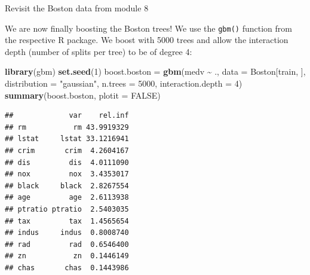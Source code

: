 \documentclass[
  10pt,
  ignorenonframetext,
]{beamer}
\newenvironment{Shaded}{\begin{snugshade}}{\end{snugshade}}
\newcommand{\AttributeTok}[1]{\textcolor[rgb]{0.13,0.29,0.53}{#1}}
\newcommand{\ConstantTok}[1]{\textcolor[rgb]{0.56,0.35,0.01}{#1}}
\newcommand{\DecValTok}[1]{\textcolor[rgb]{0.00,0.00,0.81}{#1}}
\newcommand{\FunctionTok}[1]{\textcolor[rgb]{0.13,0.29,0.53}{\textbf{#1}}}
\newcommand{\NormalTok}[1]{#1}
\newcommand{\OtherTok}[1]{\textcolor[rgb]{0.56,0.35,0.01}{#1}}
\newcommand{\SpecialCharTok}[1]{\textcolor[rgb]{0.81,0.36,0.00}{\textbf{#1}}}
\newcommand{\StringTok}[1]{\textcolor[rgb]{0.31,0.60,0.02}{#1}}
\begin{document}
\begin{frame}[fragile]
\begin{block}{Revisit the Boston data from module 8}
\protect\hypertarget{revisit-the-boston-data-from-module-8}{}
\(~\)

We are now finally boosting the Boston trees! We use the \texttt{gbm()}
function from the respective R package. We boost with 5000 trees and
allow the interaction depth (number of splits per tree) to be of degree
4:

\vspace{2mm}

\scriptsize

\begin{Shaded}
\begin{Highlighting}[]
\FunctionTok{library}\NormalTok{(gbm)}
\FunctionTok{set.seed}\NormalTok{(}\DecValTok{1}\NormalTok{)}
\NormalTok{boost.boston }\OtherTok{=} \FunctionTok{gbm}\NormalTok{(medv }\SpecialCharTok{\textasciitilde{}}\NormalTok{ ., }\AttributeTok{data =}\NormalTok{ Boston[train, ], }\AttributeTok{distribution =} \StringTok{"gaussian"}\NormalTok{,}
    \AttributeTok{n.trees =} \DecValTok{5000}\NormalTok{, }\AttributeTok{interaction.depth =} \DecValTok{4}\NormalTok{)}
\FunctionTok{summary}\NormalTok{(boost.boston, }\AttributeTok{plotit =} \ConstantTok{FALSE}\NormalTok{)}
\end{Highlighting}
\end{Shaded}

\begin{verbatim}
##             var    rel.inf
## rm           rm 43.9919329
## lstat     lstat 33.1216941
## crim       crim  4.2604167
## dis         dis  4.0111090
## nox         nox  3.4353017
## black     black  2.8267554
## age         age  2.6113938
## ptratio ptratio  2.5403035
## tax         tax  1.4565654
## indus     indus  0.8008740
## rad         rad  0.6546400
## zn           zn  0.1446149
## chas       chas  0.1443986
\end{verbatim}
\end{block}
\end{frame}
\end{document}
